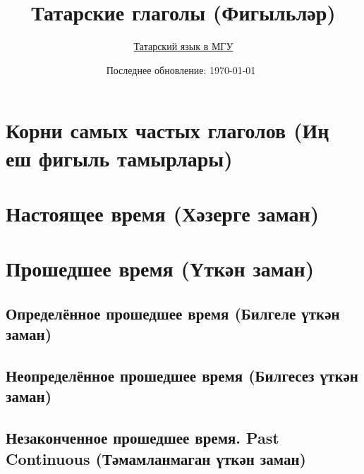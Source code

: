 



\title{\LARGE{\textbf{Татарские глаголы (Фигыльләр)}}}
\author{\href{https://vk.com/tatar.telem}{Татарский язык в МГУ}}
\date{Последнее обновление: \today\ }

\maketitle

\renewcommand{\contentsname}{Содержание (Эчтәлек)}
\tableofcontents

\section{{Корни самых частых глаголов (Иң еш фигыль тамырлары)}}





\section{Настоящее время (Хәзерге заман)}





\section{Прошедшее время (Үткән заман)}
\subsection{Определённое прошедшее время (Билгеле үткән заман)}





\subsection{Неопределённое прошедшее время (Билгесез үткән заман)}





\subsection{Незаконченное прошедшее время. Past Continuous (Тәмамланмаган үткән заман)}

